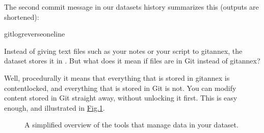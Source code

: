 \sphinxAtStartPar
The second commit message in our datasets history summarizes this (outputs are shortened):

%
\begin{sphinxVerbatim}[commandchars=\\\{\}]
gitlog\PYGZhy{}\PYGZhy{}reverse\PYGZhy{}\PYGZhy{}oneline
\end{sphinxVerbatim}
\sphinxresetverbatimhllines

\sphinxAtStartPar
Instead of giving text files such as your notes or your script
to git\sphinxhyphen{}annex, the dataset stores it in {\hyperref[\detokenize{glossary:term-Git}]{}}.
But what does it mean if files are in Git instead of git\sphinxhyphen{}annex?

\sphinxAtStartPar
Well, procedurally it means that everything that is stored in git\sphinxhyphen{}annex is
content\sphinxhyphen{}locked, and everything that is stored in Git is not. You can modify
content stored in Git straight away, without unlocking it first.
This is easy enough, and illustrated in \hyperref[\detokenize{basics/101-114-txt2git:fig-gitvsannex}]{Fig.\@ \ref{\detokenize{basics/101-114-txt2git:fig-gitvsannex}}}.

\begin{figure}[tbp]
\centering
\capstart

\noindent{}
\caption{A simplified overview of the tools that manage data in your dataset.}\label{\detokenize{basics/101-114-txt2git:id2}}\label{\detokenize{basics/101-114-txt2git:fig-gitvsannex}}\end{figure}

